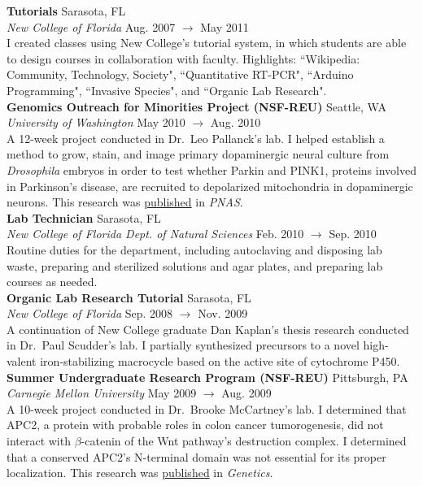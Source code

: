 \documentclass[a4paper,12pt]{article}
\newcommand{\ressubheading}[4]{
        \textbf{#1} \hfill #2\\
        \textit{#3} \hfill #4 \\}
\begin{document}
    \ressubheading{Tutorials}{Sarasota, FL}{New College of Florida}{Aug. 2007 $\rightarrow$ May 2011}
    I created classes using New College's tutorial system, in which students are able to design courses in collaboration with faculty. Highlights: ``Wikipedia: Community, Technology, Society", ``Quantitative RT-PCR", ``Arduino Programming", ``Invasive Species", and ``Organic Lab Research".\\

    \ressubheading{Genomics Outreach for Minorities Project (NSF-REU)}{Seattle, WA}{University of Washington}{May 2010 $\rightarrow$ Aug. 2010}
    A 12-week project conducted in Dr.\ Leo Pallanck's lab. I helped establish a method to grow, stain, and image primary dopaminergic neural culture from \textit{Drosophila} embryos in order to test whether Parkin and PINK1, proteins involved in Parkinson's disease, are recruited to depolarized mitochondria in dopaminergic neurons. This research was \hyperlink{neuronpub}{published} in \textit{PNAS}.\\

    \ressubheading{Lab Technician}{Sarasota, FL}{New College of Florida Dept. of Natural Sciences}{Feb. 2010 $\rightarrow$ Sep. 2010}
    Routine duties for the department, including autoclaving and disposing lab waste, preparing and sterilized solutions and agar plates, and preparing lab courses as needed. \\

    \ressubheading{Organic Lab Research Tutorial}{Sarasota, FL}{New College of Florida}{Sep. 2008 $\rightarrow$ Nov. 2009}
    A continuation of New College graduate Dan Kaplan's thesis research conducted in Dr.\ Paul Scudder's lab. I partially synthesized precursors to a novel high-valent iron-stabilizing macrocycle based on the active site of cytochrome P450.\\%

    \ressubheading{Summer Undergraduate Research Program (NSF-REU)}{Pittsburgh, PA}{Carnegie Mellon University}{May 2009 $\rightarrow$ Aug. 2009}
    A 10-week project conducted in Dr.\ Brooke McCartney's lab. I determined that APC2, a protein with probable roles in colon cancer tumorogenesis, did not interact with $\beta$-catenin of the Wnt pathway's destruction complex. I determined that a conserved APC2's N-terminal domain was not essential for its proper localization. This research was \hyperlink{carnegiepub}{published} in \textit{Genetics}.\\
    
\end{document}
